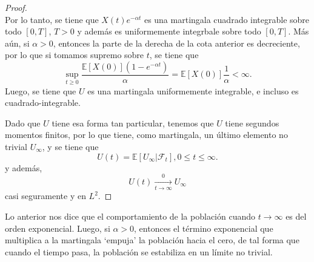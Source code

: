 \documentclass[letterpaper]{article}
\newcommand{\F}{\mathcal{F}}
\renewcommand{\to}{\rightarrow}
\newcommand{\E}{\mathbb{E}}
\newcommand{\1}{\mathds{1}}
\theoremstyle{definition}
\theoremstyle{definition}
\theoremstyle{definition}
\theoremstyle{definition}
\theoremstyle{definition}
\begin{document}
\begin{proof}
\[    \]
    Por lo tanto, se tiene que $X(t)e^{-\alpha t}$ es una martingala cuadrado integrable sobre todo $[0,T]$, $T>0$ y además es uniformemente 
    integrbale sobre todo $[0,T]$. Más aún, si $\alpha>0$, entonces la parte de la derecha de la cota anterior es decreciente, 
    por lo que si tomamos supremo sobre $t$, se tiene que 
    \[
    \sup_{t\geq0}\frac{\E\left[X(0)\right](1-e^{-\alpha t})}{\alpha}=\E\left[X(0)\right]\frac{1}{\alpha}<\infty.    
    \]
    Luego, se tiene que $U$ es una martingala uniformemente integrable, e incluso es cuadrado-integrable.\newline

    Dado que $U$ tiene esa forma tan particular, tenemos que $U$ tiene segundos momentos finitos, por lo que 
    tiene, como martingala, un último elemento no trivial $U_\infty$, y se tiene que 
    \[
    U(t)=\E\left[U_\infty|\F_t\right], 0\leq t\leq \infty.    
    \]
    y además, 
    \[
    U(t)\xrightarrow[t\to\infty]{0}U_\infty    
    \]
    casi seguramente y en $L^2$. 
\end{proof}
Lo anterior nos dice que el comportamiento de la población cuando $t\to\infty$ es del orden exponencial. Luego, si 
$\alpha>0$, entonces el término exponencial que multiplica a la martingala `empuja' la población hacia el cero, de tal forma que 
cuando el tiempo pasa, la población se estabiliza en un límite no trivial.\\
\end{document}
